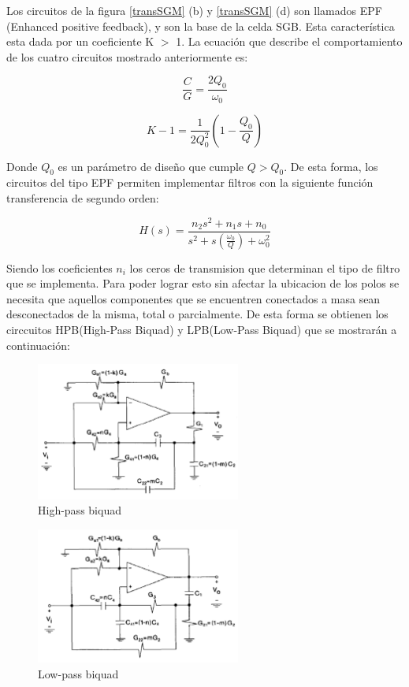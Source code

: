 Los circuitos de la figura \ref{transSGM} (b) y \ref{transSGM} (d) son llamados EPF (Enhanced positive feedback), y son la base de la celda SGB. Esta característica esta dada por un coeficiente K $>$ 1. La ecuación que describe el comportamiento de los cuatro circuitos mostrado anteriormente es:

\begin{equation}
	\frac{C}{G} = \frac{2Q_0}{\omega_0}
	\label{eq C/G}
\end{equation}

\begin{equation}
	K - 1 = \frac{1}{2Q_0^2} (1-\frac{Q_0}{Q})
	\label{eq K-1}
\end{equation}

Donde $Q_0$ es un parámetro de diseño que cumple $Q>Q_0$. De esta forma, los circuitos del tipo EPF permiten
implementar filtros con la siguiente función transferencia de segundo orden:

\begin{equation}
	H(s) = \frac{n_2 s^2 + n_1 s + n_0}{s^2 + s (\frac{\omega_0}{Q}) + \omega_0^2}
	\label{eq transferencia general}
\end{equation}

Siendo los coeficientes $n_i$ los ceros de transmision que determinan el tipo de filtro que se implementa. Para poder lograr esto sin afectar la ubicacion de los polos se necesita que aquellos componentes que se encuentren conectados a masa sean desconectados de la misma, total o parcialmente. De esta forma se obtienen los circcuitos HPB(High-Pass Biquad) y LPB(Low-Pass Biquad) que se mostrarán a continuación:

\begin{figure}[h]
	\includegraphics[width=0.6\textwidth]{../Ejercicio2-DisenoDeCeldas/3CeldaSedra/Imagenes/HP biquad.png}
	\centering
	\caption{High-pass biquad}
	\label{HPB}
\end{figure}

\begin{figure}[h]
	\includegraphics[width=0.6\textwidth]{../Ejercicio2-DisenoDeCeldas/3CeldaSedra/Imagenes/LP biquad.png}
	\centering
	\caption{Low-pass biquad}
	\label{LPB}
\end{figure}

